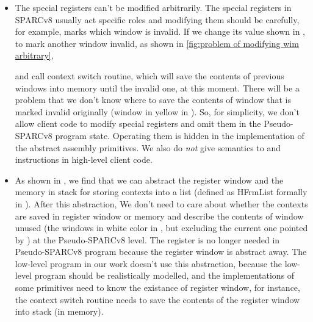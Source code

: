 \begin{itemize}
    \item 
    The special registers can't be modified arbitrarily.
    The special registers in SPARCv8 usually act specific 
    roles and modifying them should be carefully, 
    for example, \regwim{} marks which window is 
    invalid. If we change its value shown in 
    \Fig{\ref{fig:Abstraction of Register Windows and Memory}}, 
    to mark another window invalid, as shown in  
    \ref{fig:problem of modifying wim arbitrary},  
    \begin{center}
        \vspace*{-0.5em}
        
        \vspace*{-0.5em}
        \label{fig:problem of modifying wim arbitrary}
    \end{center}
    and call context switch routine, which will  
    save the contents of previous windows into memory
    until the invalid one, at this moment. 
    There will be a problem that we don't know 
    where to save the contents of window that 
    is marked invalid originally 
    (window in yellow in \Fig{\ref{fig:problem of modifying wim arbitrary}}). 
    So, for simplicity, we don't allow client code 
    to modify special registers and omit them 
    in the Pseudo-SPARCv8 program state. Operating them 
    is hidden in the implementation of the 
    abstract assembly primitives. 
    We also do \textit{not} give semantics to 
    \cwr{} and \rd{} instructions in high-level 
    client code. 
    \item 
    As shown in \Fig{\ref{fig:Abstraction of Register Windows and Memory}}, 
    we find that we can abstract the register window 
    and the memory in stack for storing contexts 
    into a list (defined as 
    HFrmList formally in \Fig{\ref{fig:machine-state-concur-pseudo-sparc}}).  
    After this abstraction, We don't need to care about 
    whether the contexts are saved in register window or 
    memory and describe the contents of window unused 
    (the windows in white color in 
    \Fig{\ref{fig:Abstraction of Register Windows and Memory}}, 
    but excluding the current one pointed by \regcwp{}) 
    at the Pseudo-SPARCv8 level. 
    The \regcwp{} register is no longer needed in 
    Pseudo-SPARCv8 program because the register window 
    is abstract away. 
    The low-level program in our work doesn't use this 
    abstraction, because the low-level program 
    should be realistically modelled, 
    and the implementations of some primitives 
    need to know the existance of register window,  
    for instance, the context switch routine 
    needs to save the contents 
    of the register window into stack (in memory).
\end{itemize}

